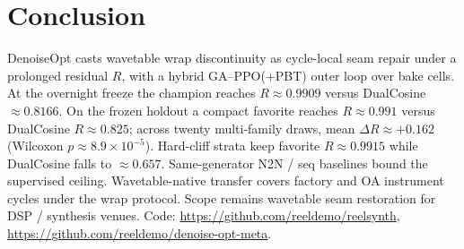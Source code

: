 \section{Conclusion}
\label{sec:conclusion}

DenoiseOpt casts wavetable wrap discontinuity as cycle-local seam repair under a prolonged residual $R$, with a hybrid GA--PPO(+PBT) outer loop over bake cells.
At the overnight freeze the champion reaches $R\approx 0.9909$ versus DualCosine $\approx 0.8166$.
On the frozen holdout a compact favorite reaches $R\approx 0.991$ versus DualCosine $R\approx 0.825$; across twenty multi-family draws, mean $\Delta R\approx{+}0.162$ (Wilcoxon $p\approx 8.9{\times}10^{-5}$).
Hard-cliff strata keep favorite $R\approx 0.9915$ while DualCosine falls to $\approx 0.657$.
Same-generator N2N / seq baselines bound the supervised ceiling.
Wavetable-native transfer covers factory and OA instrument cycles under the wrap protocol.
Scope remains wavetable seam restoration for DSP / synthesis venues.
Code: \url{https://github.com/reeldemo/reelsynth}, \url{https://github.com/reeldemo/denoise-opt-meta}.
